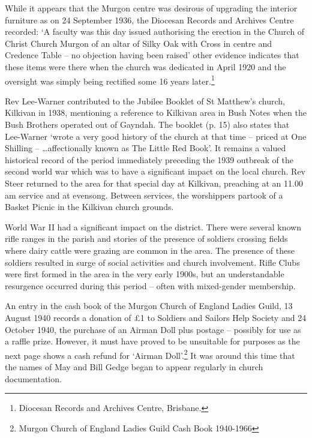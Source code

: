 While it appears that the Murgon centre was desirous of upgrading the interior furniture as on 24 September 1936, the Diocesan Records and Archives Centre recorded: `A faculty was this day issued authorising the erection in the Church of Christ Church Murgon of an altar of Silky Oak with Cross in centre and Credence Table -- no objection having been raised' other evidence indicates that these items were there when the church was dedicated in April 1920 and the oversight was simply being rectified some 16 years later.\footnote{Diocesan Records and Archives Centre, Brisbane.}

Rev Lee-Warner contributed to the Jubilee Booklet of St Matthew's church, Kilkivan in 1938, mentioning a reference to Kilkivan area in Bush Notes when the Bush Brothers operated out of Gayndah. The booklet (p. 15) also states that Lee-Warner `wrote a very good history of the church at that time -- priced at One Shilling -- \ldots affectionally known as The Little Red Book'. It remains a valued historical record of the period immediately preceding the 1939 outbreak of the second world war which was to have a significant impact on the local church. Rev Steer returned to the area for that special day at Kilkivan, preaching at an 11.00 am service and at evensong. Between services, the worshippers partook of a Basket Picnic in the Kilkivan church grounds.

World War II had a significant impact on the district. There were several known rifle ranges in the parish and stories of the presence of soldiers crossing fields where dairy cattle were grazing are common in the area. The presence of these soldiers resulted in surge of social activities and church involvement. Rifle Clubs were first formed in the area in the very early 1900s, but an understandable resurgence occurred during this period -- often with mixed-gender membership.

An entry in the cash book of the Murgon Church of England Ladies Guild, 13 August 1940 records a donation of £1 to Soldiers and Sailors Help Society and 24 October 1940, the purchase of an Airman Doll plus postage -- possibly for use as a raffle prize. However, it must have proved to be unsuitable for purposes as the next page shows a cash refund for `Airman Doll'.\footnote{Murgon Church of England Ladies Guild Cash Book 1940-1966} It was around this time that the names of May and Bill Gedge began to appear regularly in church documentation.

